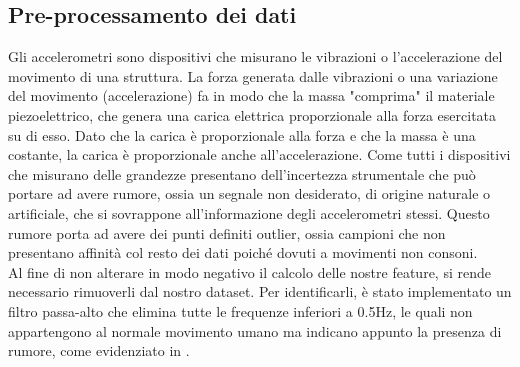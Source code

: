 \subsection{Pre-processamento dei dati}
Gli accelerometri sono dispositivi che misurano le vibrazioni o l'accelerazione del movimento di una struttura. La forza generata dalle vibrazioni o una variazione del movimento (accelerazione) fa in modo che la massa "comprima" il materiale piezoelettrico, che genera una carica elettrica proporzionale alla forza esercitata su di esso. Dato che la carica è proporzionale alla forza e che la massa è una costante, la carica è proporzionale anche all'accelerazione. Come tutti i dispositivi che misurano delle grandezze presentano dell'incertezza strumentale che può portare ad avere rumore, ossia un segnale non desiderato, di origine naturale o artificiale, che si sovrappone all'informazione degli accelerometri stessi. Questo rumore porta ad avere dei punti definiti outlier, ossia campioni che non presentano affinità col resto dei dati poiché dovuti a movimenti non consoni.\\
Al fine di non alterare in modo negativo il calcolo delle nostre feature, si rende necessario rimuoverli dal nostro dataset. Per identificarli, è stato implementato un filtro passa-alto che elimina tutte le frequenze inferiori a 0.5Hz, le quali non appartengono al normale movimento umano ma indicano appunto la presenza di rumore, come evidenziato in \cite{21}.
